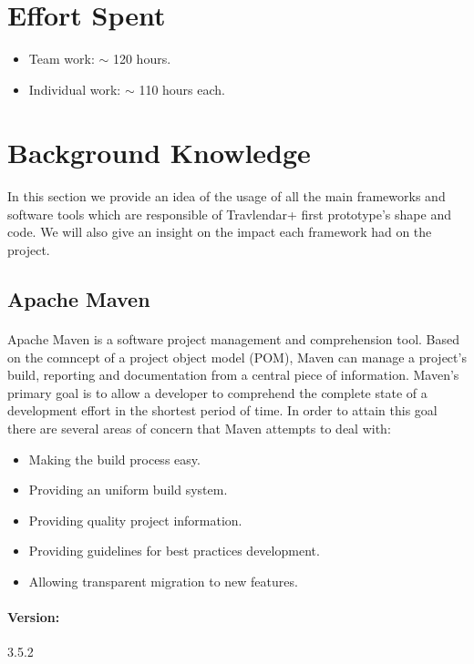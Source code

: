 \documentclass{article}
\begin{document}
	\section{Effort Spent}
		\begin{itemize}
			\item{Team work:} $\sim$ 120 hours.
			\item{Individual work:} $\sim$ 110 hours each.
		\end{itemize}

\appendix
\newpage
	\section{Background Knowledge}
		\paragraph{}In this section we provide an idea of the usage of all the main frameworks and software tools which are responsible of Travlendar+ first prototype's shape and code. We will also give an insight on the impact each framework had on the project.
		\subsection{Apache Maven}
		\paragraph{}Apache Maven is a software project management and comprehension tool. Based on the comncept of a project object model (POM), Maven can manage a project's build, reporting and documentation from a central piece of information. Maven's primary goal is to allow a developer to comprehend the complete state of a development effort in the shortest period of time. In order to attain this goal there are several areas of concern that Maven attempts to deal with:
\begin{itemize}
\item{}Making the build process easy.
\item{}Providing an uniform build system.
\item{}Providing quality project information.
\item{}Providing guidelines for best practices development.
\item{}Allowing transparent migration to new features.
\end{itemize}
		\paragraph{Version:} 3.5.2
\end{document}

